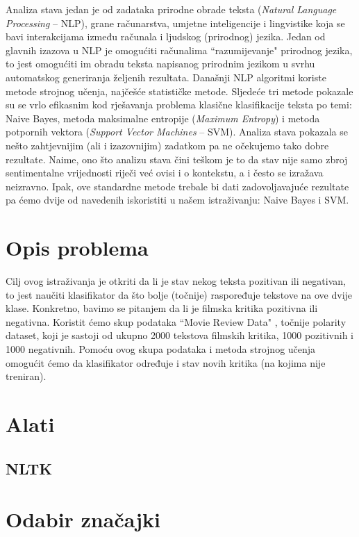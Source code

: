 \documentclass[conference]{IEEEtran}
\begin{document}
Analiza stava jedan je od zadataka prirodne obrade teksta (\textit{Natural Language Processing} -- NLP), grane računarstva, umjetne inteligencije i lingvistike koja se bavi interakcijama između računala i ljudskog (prirodnog) jezika. Jedan od glavnih izazova u NLP je omogućiti računalima ``razumijevanje" prirodnog jezika, to jest omogućiti im obradu teksta napisanog prirodnim jezikom u svrhu automatskog generiranja željenih rezultata. Današnji NLP algoritmi koriste metode strojnog učenja, najčešće statističke metode. Sljedeće tri metode pokazale su se vrlo efikasnim kod rješavanja problema klasične klasifikacije teksta po temi: Naive Bayes, metoda maksimalne entropije (\textit{Maximum Entropy}) i metoda potpornih vektora (\textit{Support Vector Machines} -- SVM). Analiza stava pokazala se nešto zahtjevnijim (ali i izazovnijim) zadatkom pa ne očekujemo tako dobre rezultate. Naime, ono što analizu stava čini teškom je to da stav nije samo zbroj sentimentalne vrijednosti riječi već ovisi i o kontekstu, a i često se izražava neizravno. Ipak, ove standardne metode trebale bi dati zadovoljavajuće rezultate pa ćemo dvije od navedenih iskoristiti u našem istraživanju: Naive Bayes i SVM.

\section{Opis problema}

Cilj ovog istraživanja je otkriti da li je stav nekog teksta pozitivan ili negativan, to jest naučiti klasifikator da što bolje (točnije) raspoređuje tekstove na ove dvije klase. Konkretno, bavimo se pitanjem da li je filmska kritika pozitivna ili negativna. Koristit ćemo skup podataka ``Movie Review Data" \cite{dataset}, točnije polarity dataset, koji je sastoji od ukupno 2000 tekstova filmskih kritika, 1000 pozitivnih i 1000 negativnih. Pomoću ovog skupa podataka i metoda strojnog učenja omogućit ćemo da klasifikator određuje i stav novih kritika (na kojima nije treniran).

\section{Alati}

\subsection{NLTK}

\section{Odabir značajki}
\end{document}
